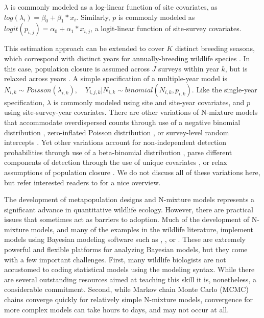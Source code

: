 \documentclass[article]{jss}
\begin{document}
$\lambda$ is commonly modeled as a log-linear function of site covariates, as $log(\lambda_i) = \beta_0 + \beta_1 * x_i$. Similarly, $p$ is commonly modeled as $logit(p_{i,j}) = \alpha_0 + \alpha_1 * x_{i,j}$, a logit-linear function of site-survey covariates.

This estimation approach can be extended to cover $K$ distinct breeding seasons, which correspond with distinct years for annually-breeding wildlife species \citep{Kery_Dorazio_Soldaat_Van_Strien_Zuiderwijk_Royle_2009}.  In this case, population closure is assumed across $J$ surveys within year $k$, but is relaxed across years \citep{Kery_Dorazio_Soldaat_Van_Strien_Zuiderwijk_Royle_2009}. A simple specification of a multiple-year model is $N_{i,k} \sim Poisson(\lambda_{i,k}), \quad Y_{i,j,k} | N_{i,k} \sim binomial(N_{i,k}, p_{i,k})$.  Like the single-year specification, $\lambda$ is commonly modeled using site and site-year covariates, and $p$ using site-survey-year covariates.  There are other variations of N-mixture models that accommodate overdispersed counts through use of a negative binomial distribution \citep{Kery_Royle_2010}, zero-inflated Poisson distribution \citep{Wenger_Freeman_2008}, or survey-level random intercepts \citep{Kery_Schaub_2011}.  Yet other variations account for non-independent detection probabilities through use of a beta-binomial distribution \citep{Martin_Royle_Mackenzie_Edwards_Kery_Gardner_2011}, parse different components of detection through the use of unique covariates \citep{O'Donnell_Thompson_III_Semlitsch_2015}, or relax assumptions of population closure \citep{Chandler_Royle_King_2011, Dail_Madsen_2011}.  We do not discuss all of these variations here, but refer interested readers to \cite{Denes_Silveira_Beissinger_2015} for a nice overview.

The development of metapopulation designs and N-mixture models represents a significant advance in quantitative wildlife ecology.  However, there are practical issues that sometimes act as barriers to adoption.  Much of the development of N-mixture models, and many of the examples in the wildlife literature, implement models using Bayesian modeling software such as , , or  \citep{Lunn_Jackson_Best_Thomas_Spiegelhalter_2012}.  These are extremely powerful and flexible platforms for analyzing Bayesian models, but they come with a few important challenges.  First, many wildlife biologists are not accustomed to coding statistical models using the  modeling syntax.  While there are several outstanding resources aimed at teaching this skill \citep{Royle_Dorazio_2008, Kery_2010, Kery_Schaub_2011, Kery_Royle_2015} it is, nonetheless, a considerable commitment.  Second, while Markov chain Monte Carlo (MCMC) chains converge quickly for relatively simple N-mixture models, convergence for more complex models can take hours to days, and may not occur at all.
\end{document}
